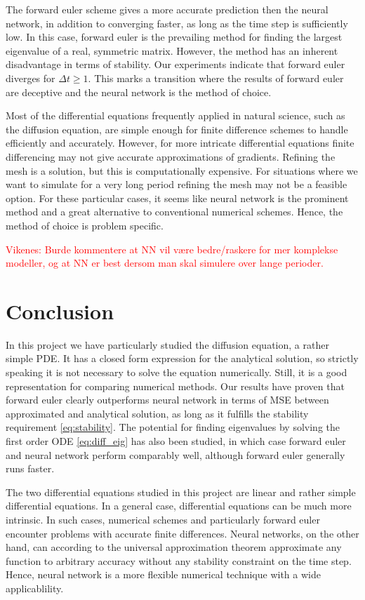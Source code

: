 \documentclass[12pt]{extarticle}
\begin{document}
The forward euler scheme gives a more accurate prediction then the neural network, in addition to converging faster, as long as the time step is sufficiently low. In this case, forward euler is the prevailing method for finding the largest eigenvalue of a real, symmetric matrix. However, the method has an inherent disadvantage in terms of stability. Our experiments indicate that forward euler diverges for $\Delta t \ge 1$. This marks a transition where the results of forward euler are deceptive and the neural network is the method of choice.

Most of the differential equations frequently applied in natural science, such as the diffusion equation, are simple enough for finite difference schemes to handle efficiently and accurately. However, for more intricate differential equations finite differencing may not give accurate approximations of gradients. Refining the mesh is a solution, but this is computationally expensive. For situations where we want to simulate for a very long period refining the mesh may not be a feasible option. For these particular cases, it seems like neural network is the prominent method and a great alternative to conventional numerical schemes. Hence, the method of choice is problem specific. 

\textcolor{red}{Vikenes: Burde kommentere at NN vil være bedre/raskere for mer komplekse modeller, og at NN er best dersom man skal simulere over lange perioder.}



\section{Conclusion}
In this project we have particularly studied the diffusion equation, a rather simple PDE. It has a closed form expression for the analytical solution, so strictly speaking it is not necessary to solve the equation numerically. Still, it is a good representation for comparing numerical methods. Our results have proven that forward euler clearly outperforms neural network in terms of MSE between approximated and analytical solution, as long as it fulfills the stability requirement \eqref{eq:stability}. The potential for finding eigenvalues by solving the first order ODE \eqref{eq:diff_eig} has also been studied, in which case forward euler and neural network perform comparably well, although forward euler generally runs faster. 

The two differential equations studied in this project are linear and rather simple differential equations. In a general case, differential equations can be much more intrinsic. In such cases, numerical schemes and particularly forward euler encounter problems with accurate finite differences. Neural networks, on the other hand, can according to the universal approximation theorem approximate any function to arbitrary accuracy without any stability constraint on the time step. Hence, neural network is a more flexible numerical technique with a wide applicablility.
\end{document}
